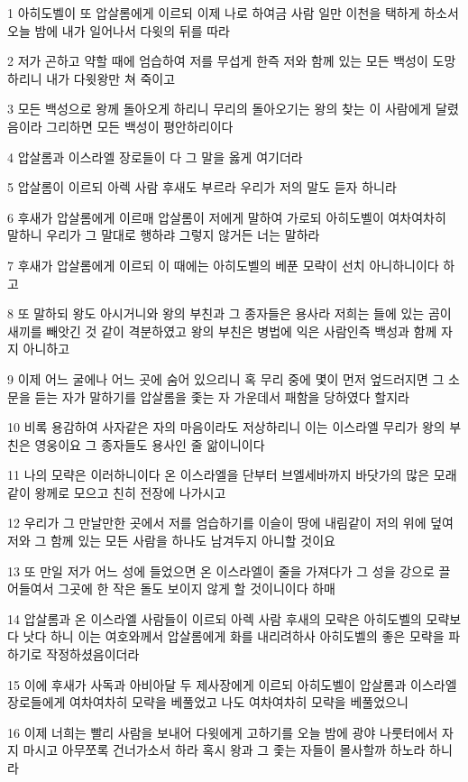 \par 1 아히도벨이 또 압살롬에게 이르되 이제 나로 하여금 사람 일만 이천을 택하게 하소서 오늘 밤에 내가 일어나서 다윗의 뒤를 따라
\par 2 저가 곤하고 약할 때에 엄습하여 저를 무섭게 한즉 저와 함께 있는 모든 백성이 도망하리니 내가 다윗왕만 쳐 죽이고
\par 3 모든 백성으로 왕께 돌아오게 하리니 무리의 돌아오기는 왕의 찾는 이 사람에게 달렸음이라 그리하면 모든 백성이 평안하리이다
\par 4 압살롬과 이스라엘 장로들이 다 그 말을 옳게 여기더라
\par 5 압살롬이 이르되 아렉 사람 후새도 부르라 우리가 저의 말도 듣자 하니라
\par 6 후새가 압살롬에게 이르매 압살롬이 저에게 말하여 가로되 아히도벨이 여차여차히 말하니 우리가 그 말대로 행하랴 그렇지 않거든 너는 말하라
\par 7 후새가 압살롬에게 이르되 이 때에는 아히도벨의 베푼 모략이 선치 아니하니이다 하고
\par 8 또 말하되 왕도 아시거니와 왕의 부친과 그 종자들은 용사라 저희는 들에 있는 곰이 새끼를 빼앗긴 것 같이 격분하였고 왕의 부친은 병법에 익은 사람인즉 백성과 함께 자지 아니하고
\par 9 이제 어느 굴에나 어느 곳에 숨어 있으리니 혹 무리 중에 몇이 먼저 엎드러지면 그 소문을 듣는 자가 말하기를 압살롬을 좇는 자 가운데서 패함을 당하였다 할지라
\par 10 비록 용감하여 사자같은 자의 마음이라도 저상하리니 이는 이스라엘 무리가 왕의 부친은 영웅이요 그 종자들도 용사인 줄 앎이니이다
\par 11 나의 모략은 이러하니이다 온 이스라엘을 단부터 브엘세바까지 바닷가의 많은 모래같이 왕께로 모으고 친히 전장에 나가시고
\par 12 우리가 그 만날만한 곳에서 저를 엄습하기를 이슬이 땅에 내림같이 저의 위에 덮여 저와 그 함께 있는 모든 사람을 하나도 남겨두지 아니할 것이요
\par 13 또 만일 저가 어느 성에 들었으면 온 이스라엘이 줄을 가져다가 그 성을 강으로 끌어들여서 그곳에 한 작은 돌도 보이지 않게 할 것이니이다 하매
\par 14 압살롬과 온 이스라엘 사람들이 이르되 아렉 사람 후새의 모략은 아히도벨의 모략보다 낫다 하니 이는 여호와께서 압살롬에게 화를 내리려하사 아히도벨의 좋은 모략을 파하기로 작정하셨음이더라
\par 15 이에 후새가 사독과 아비아달 두 제사장에게 이르되 아히도벨이 압살롬과 이스라엘 장로들에게 여차여차히 모략을 베풀었고 나도 여차여차히 모략을 베풀었으니
\par 16 이제 너희는 빨리 사람을 보내어 다윗에게 고하기를 오늘 밤에 광야 나룻터에서 자지 마시고 아무쪼록 건너가소서 하라 혹시 왕과 그 좇는 자들이 몰사할까 하노라 하니라
